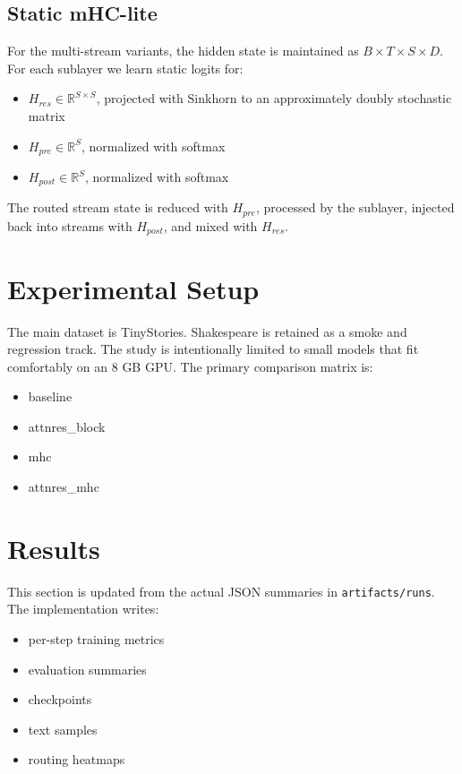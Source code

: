 \documentclass[11pt]{article}
\begin{document}
\subsection{Static mHC-lite}
For the multi-stream variants, the hidden state is maintained as $B \times T \times S \times D$. For each sublayer we learn static logits for:
\begin{itemize}
\item $H_{res} \in \mathbb{R}^{S \times S}$, projected with Sinkhorn to an approximately doubly stochastic matrix
\item $H_{pre} \in \mathbb{R}^{S}$, normalized with softmax
\item $H_{post} \in \mathbb{R}^{S}$, normalized with softmax
\end{itemize}
The routed stream state is reduced with $H_{pre}$, processed by the sublayer, injected back into streams with $H_{post}$, and mixed with $H_{res}$.

\section{Experimental Setup}
The main dataset is TinyStories. Shakespeare is retained as a smoke and regression track. The study is intentionally limited to small models that fit comfortably on an 8 GB GPU. The primary comparison matrix is:
\begin{itemize}
\item baseline
\item attnres\_block
\item mhc
\item attnres\_mhc
\end{itemize}

\section{Results}
This section is updated from the actual JSON summaries in \texttt{artifacts/runs}. The implementation writes:
\begin{itemize}
\item per-step training metrics
\item evaluation summaries
\item checkpoints
\item text samples
\item routing heatmaps
\end{itemize}
\end{document}
